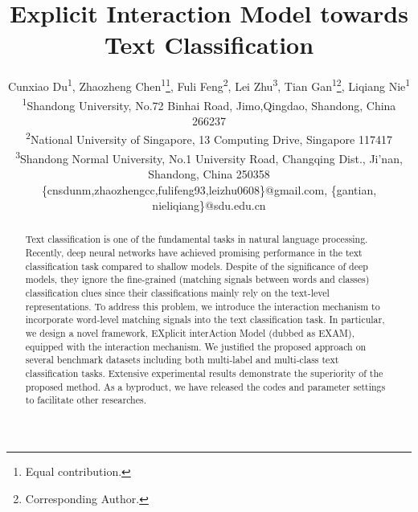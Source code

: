 \documentclass[letterpaper]{article} \usepackage{aaai19}  \usepackage{times}  \usepackage{helvet}  \usepackage{courier}  \usepackage{url}  \usepackage{graphicx}
\begin{document}
\title{Explicit Interaction Model towards Text Classification}
\author{
Cunxiao Du\textsuperscript{1},
Zhaozheng Chen\textsuperscript{1}\thanks{Equal contribution.},
Fuli Feng\textsuperscript{2}\footnotemark[1],
Lei Zhu\textsuperscript{3},
Tian Gan\textsuperscript{1}\thanks{Corresponding Author.}, 
Liqiang Nie\textsuperscript{1}\\
\textsuperscript{1}Shandong University, No.72 Binhai Road, Jimo,Qingdao, Shandong, China 266237\\
\textsuperscript{2}National University of Singapore, 13 Computing Drive, Singapore 117417\\
\textsuperscript{3}Shandong Normal University,
No.1 University Road, Changqing Dist.,
Ji'nan, Shandong, China 250358
\\
\{cnsdunm,zhaozhengcc,fulifeng93,leizhu0608\}@gmail.com,
\{gantian, nieliqiang\}@sdu.edu.cn
}



\maketitle

\begin{abstract}
Text classification is one of the fundamental tasks in natural language processing. Recently, deep neural networks have achieved promising performance in the text classification task compared to shallow models. Despite of the significance of deep models, they ignore the fine-grained (matching signals between words and classes) classification clues since their classifications mainly rely on the text-level representations. To address this problem, we introduce the interaction mechanism to incorporate word-level matching signals into the text classification task. In particular, we design a novel framework, EXplicit interAction Model (dubbed as EXAM), equipped with the interaction mechanism. We justified the proposed approach on several benchmark datasets including  both multi-label and multi-class text classification tasks. Extensive experimental results demonstrate the superiority of the proposed method. As a byproduct, we have released the codes and parameter settings to facilitate other researches. 
\end{abstract}
\end{document}
